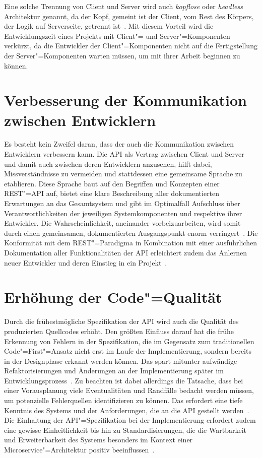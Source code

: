 Eine solche Trennung von Client und Server wird auch \emph{kopflose} oder \emph{\foreignlanguage{american}{headless}} Architektur genannt, da der Kopf, gemeint ist der Client, vom Rest des Körpers, der Logik auf Serverseite, getrennt ist~\cite[5]{kul23}.
Mit diesem Vorteil wird die Entwicklungszeit eines Projekts mit Client"= und Server"=Komponenten verkürzt, da die Entwickler der Client"=Komponenten nicht auf die Fertigstellung der Server"=Komponenten warten müssen, um mit ihrer Arbeit beginnen zu können.

\section{Verbesserung der Kommunikation zwischen Entwicklern}
Es besteht kein Zweifel daran, dass der \AFA auch die Kommunikation zwischen Entwicklern verbessern kann.
Die \ac{API} als Vertrag zwischen Client und Server und damit auch zwischen deren Entwicklern anzusehen, hilft dabei, Missverständnisse zu vermeiden und stattdessen eine gemeinsame Sprache zu etablieren. Diese Sprache baut auf den Begriffen und Konzepten einer \acs{REST}"=\acs{API} auf, bietet eine klare Beschreibung aller dokumentierten Erwartungen an das Gesamtsystem und gibt im Optimalfall Aufschluss über Verantwortlichkeiten der jeweiligen Systemkomponenten und respektive ihrer Entwickler.
Die Wahrscheinlichkeit, aneinander vorbeizuarbeiten, wird somit durch einen gemeinsamen, dokumentierten Ausgangspunkt enorm verringert~\cite[1628]{cha21}.
Die Konformität mit dem \ac{REST}"=Paradigma in Kombination mit einer ausführlichen Dokumentation aller Funktionalitäten der \ac{API} erleichtert zudem das Anlernen neuer Entwickler und deren Einstieg in ein Projekt~\cite[355]{de23}.

\section{Erhöhung der Code"=Qualität}
Durch die frühestmögliche Spezifikation der \ac{API} wird auch die Qualität des produzierten Quellcodes erhöht.
Den größten Einfluss darauf hat die frühe Erkennung von Fehlern in der Spezifikation, die im Gegensatz zum traditionellen Code"=First"=Ansatz nicht erst im Laufe der Implementierung, sondern bereits in der Designphase erkannt werden können.
Das spart mitunter aufwändige Refaktorisierungen und Änderungen an der Implementierung später im Entwicklungsprozess~\cite{vol22}.
Zu beachten ist dabei allerdings die Tatsache, dass bei einer Vorausplanung viele Eventualitäten und Randfälle bedacht werden müssen, um potenzielle Fehlerquellen identifizieren zu können. Das erfordert eine tiefe Kenntnis des Systems und der Anforderungen, die an die \ac{API} gestellt werden~\cite[362]{de23}.
Die Einhaltung der \ac{API}"=Spezifikation bei der Implementierung erfordert zudem eine gewisse Einheitlichkeit bis hin zu Standardisierungen, die die Wartbarkeit und Erweiterbarkeit des Systems besonders im Kontext einer Microservice"=Architektur positiv beeinflussen~\cite[1628]{cha21}.